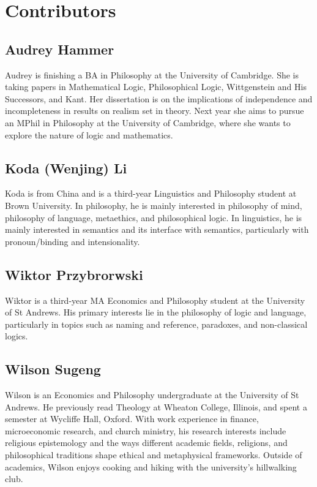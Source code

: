\chapter{Contributors}

\section*{Audrey Hammer}

Audrey is finishing a BA in Philosophy at the University of Cambridge.
She is taking papers in Mathematical Logic, Philosophical Logic,
Wittgenstein and His Successors, and Kant. Her dissertation is on the
implications of independence and incompleteness in results on realism
set in theory. Next year she aims to pursue an MPhil in Philosophy at
the University of Cambridge, where she wants to explore the nature of
logic and mathematics.

\section*{Koda (Wenjing) Li}

Koda is from China and is a third-year Linguistics and Philosophy
student at Brown University. In philosophy, he is mainly interested in
philosophy of mind, philosophy of language, metaethics, and
philosophical logic.
In linguistics, he is mainly interested in semantics and its interface
with semantics, particularly with pronoun/binding and intensionality.

\section*{Wiktor Przybrorwski}

Wiktor is a third-year MA Economics and Philosophy student at the
University of St Andrews. His primary interests lie in the philosophy
of logic and language, particularly in topics such as naming and
reference, paradoxes, and non-classical logics.

\section*{Wilson Sugeng}

Wilson is an Economics and Philosophy undergraduate at the University of
St Andrews. He previously read Theology at Wheaton College, Illinois,
and spent a semester at Wycliffe Hall, Oxford. With work experience in
finance, microeconomic research, and church ministry, his research
interests include religious epistemology and the ways different academic
fields, religions, and philosophical traditions shape ethical and
metaphysical frameworks. Outside of academics, Wilson enjoys cooking and
hiking with the university's hillwalking club.
